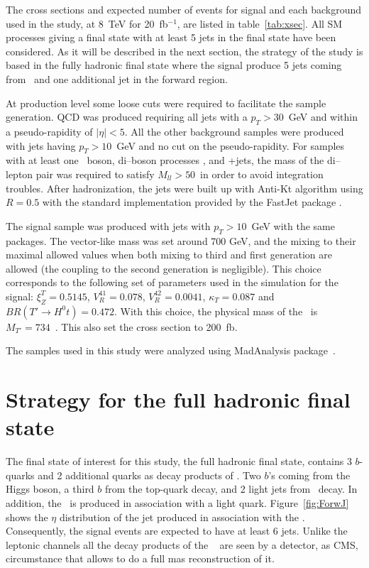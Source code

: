 The cross sections and expected number of events for signal and each background used in the study, at 8~TeV for 20~fb$^{-1}$, are listed in table~\ref{tab:xsec}. All SM processes giving a final state with at least 5 jets in the final state have been considered. As it will be described in the next section, the strategy of the study is based in the fully hadronic final state where the signal produce 5 jets coming from \Tp~and one additional jet in the forward region.

At production level some loose cuts were required to facilitate the sample generation. QCD was produced requiring all jets with a $p_{T}>30$~GeV and within a pseudo-rapidity of $|\eta|<5$. All the other background samples were produced with jets having $p_{T}>10$~GeV and no cut on the pseudo-rapidity. For samples with at least one \Z~boson, di--boson processes \Z\Z, \W\Z and \Z+jets, the mass of the di--lepton pair was required to satisfy $M_{ll}>50$~\GeVcc in order to avoid integration troubles. After hadronization, the jets were built up with Anti-Kt algorithm using $R=0.5$ with the standard implementation provided by the FastJet package \cite{Cacciari:2011ma}.

The signal sample was produced with jets with $p_{T}>10$~GeV with the same packages. The vector-like mass was set around 700 GeV, and the mixing to their maximal allowed values when both mixing to third and first generation are allowed (the coupling to the second generation is negligible). This choice corresponds to the following set of parameters used in the simulation for the signal: $\xi_Z^{T}=0.5145$, $V_{R}^{41}=0.078$, $V_{R}^{42}=0.0041$, $\kappa_{T}=0.087$ and $BR(T' \to H^{0} t)=0.472$. With this choice, the physical mass of the \Tp~is $M_{T'}=734$~\GeVcc. This also set the cross section to 200~fb.

The samples used in this study were analyzed using MadAnalysis package~\cite{Conte:2012fm, Conte:2014zja}.

\section{Strategy for the full hadronic final state}
\label{sec:Pstra}

The final state of interest for this study, the full hadronic final state, contains 3 $b$-quarks and 2 additional quarks as decay products of \Tp. Two $b$'s coming from the Higgs boson, a third $b$ from the top-quark decay, and 2 light jets from \W~decay. In addition, the \Tp~is produced in association with a light quark. Figure~\ref{fig:ForwJ} shows the $\eta$ distribution of the jet produced in association with the \Tp. Consequently, the signal events are expected to have at least 6 jets. Unlike the leptonic channels all the decay products of the \Tp~ are seen by a detector, as CMS, circumstance that allows to do a full mas reconstruction of it.

